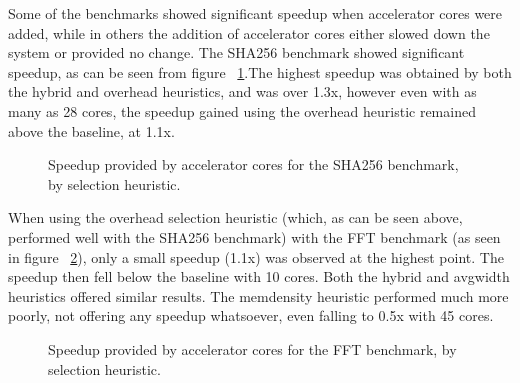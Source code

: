 \documentclass{UoYCSproject}
\begin{document}
Some of the benchmarks showed significant speedup when accelerator cores were added, while in others the addition of
accelerator cores either slowed down the system or provided no change. The SHA256 benchmark showed significant speedup,
as can be seen from figure ~\ref{fig:speedupSHA256}.The highest speedup was obtained by both the hybrid and overhead heuristics,
and was over 1.3x, however even with as many as 28 cores, the speedup gained using the overhead heuristic remained above the
baseline, at 1.1x.

\begin{figure}[H]
\caption{Speedup provided by accelerator cores for the SHA256 benchmark, by selection heuristic.}
\label{fig:speedupSHA256}
\end{figure}

When using the overhead selection heuristic (which, as can be seen above, performed well with the SHA256 benchmark)
with the FFT benchmark (as seen in figure ~\ref{fig:speedupFFT}), only a small speedup (1.1x) was observed at the highest
point. The speedup then fell below the baseline with 10 cores. Both the hybrid and avgwidth heuristics offered similar results.
The memdensity heuristic performed much more poorly, not offering any speedup whatsoever, even falling to 0.5x with 45 cores.

\begin{figure}[H]
\caption{Speedup provided by accelerator cores for the FFT benchmark, by selection heuristic.}
\label{fig:speedupFFT}
\end{figure}
\end{document}
